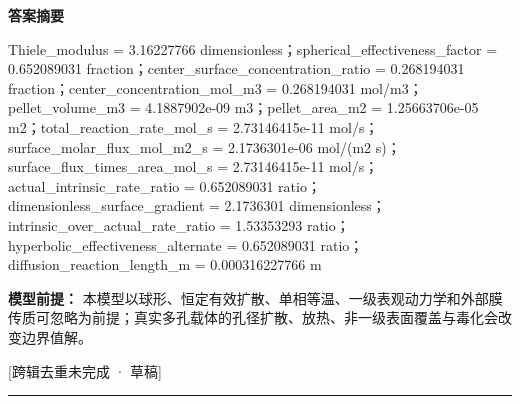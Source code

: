 \documentclass[UTF8,11pt,a4paper]{ctexart}
\begin{document}
\noindent\textbf{答案摘要}\par
Thiele\_modulus = 3.16227766 dimensionless；spherical\_effectiveness\_factor = 0.652089031 fraction；center\_surface\_concentration\_ratio = 0.268194031 fraction；center\_concentration\_mol\_m3 = 0.268194031 mol/m3；pellet\_volume\_m3 = 4.1887902e-09 m3；pellet\_area\_m2 = 1.25663706e-05 m2；total\_reaction\_rate\_mol\_s = 2.73146415e-11 mol/s；surface\_molar\_flux\_mol\_m2\_s = 2.1736301e-06 mol/(m2 s)；surface\_flux\_times\_area\_mol\_s = 2.73146415e-11 mol/s；actual\_intrinsic\_rate\_ratio = 0.652089031 ratio；dimensionless\_surface\_gradient = 2.1736301 dimensionless；intrinsic\_over\_actual\_rate\_ratio = 1.53353293 ratio；hyperbolic\_effectiveness\_alternate = 0.652089031 ratio；diffusion\_reaction\_length\_m = 0.000316227766 m\par
\noindent\textbf{模型前提：}
本模型以球形、恒定有效扩散、单相等温、一级表观动力学和外部膜传质可忽略为前提；真实多孔载体的孔径扩散、放热、非一级表面覆盖与毒化会改变边界值解。\par
\noindent\textcolor{red!65!black}{[跨辑去重未完成 · 草稿]} \par
\medskip\hrule\medskip
{}
\end{document}
